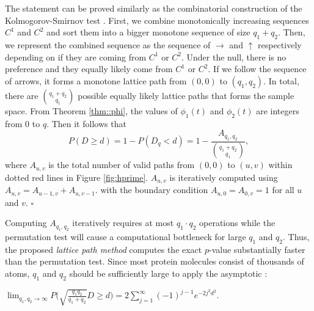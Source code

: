 \documentclass{llncs}
\begin{document}
 The statement can be proved similarly as the combinatorial construction of the Kolmogorov-Smirnov test \cite{bohm.2010,gibbons.1992,chung.2019.NN}. First, we combine monotonically increasing sequences $C^1$ and $C^2$ and sort them into a bigger monotone sequence of size $q_1 + q_2$. Then, we represent the combined sequence as the sequence of $\rightarrow$ and $\uparrow$ respectively depending on if they are coming from $C^1$ or $C^2$. Under the null, there is no preference and they equally likely come from $C^1$ or $C^2$. If we follow the sequence of arrows, it forms a monotone lattice path from $(0,0)$ to $(q_1,q_2)$.  In total, there are  ${q_1 + q_2 \choose q_1}$ possible equally likely lattice paths that forms the sample space. 
From Theorem \ref{thm::phi},  the values of $\phi_1(t)$ and $\phi_2(t)$ are integers from 0 to $q$. Then it follows that  
$$P (D \geq d ) = 1 - P ( D_q < d ) = 1 - \frac{A_{q_1,q_2}}{{q_1 + q_2 \choose q_1}},$$
where $A_{u,v}$ is the total number of valid paths from $(0,0)$ to $(u,v)$ within dotted red lines in Figure \ref{fig:hprime}.
$A_{u,v}$ is iteratively computed using $A_{u,v} = A_{u-1,v} + A_{u, v-1}.$
with the boundary condition $A_{u,0}=A_{0,v}=1$ for all $u$ and $v$. \hfill $\square$

Computing $A_{q_1,q_2}$ iteratively requires at most $q_1 \cdot q_2$ operations while the permutation test will cause a  computational bottleneck for large $q_1$ and $q_2$. Thus, the proposed {\em lattice path method} computes the exact $p$-value substantially faster than the permutation test. 
Since most protein molecules consist of thousands of atoms, $q_1$ and $q_2$ should be sufficiently large to apply the asymptotic  \cite{gibbons.1992,smirnov.1939,chung.2017.IPMI}: 

\begin{theorem} 
\label{theorem:lim2}
$\lim_{q_1,q_2 \to \infty}  P\Big( \sqrt{\frac{q_1q_2}{q_1 + q_2}} D \geq  d  \Big)  = 2 \sum_{j=1}^{\infty} (-1)^{j-1}e^{-2j^2d^2}.$
\end{theorem}
\end{document}
